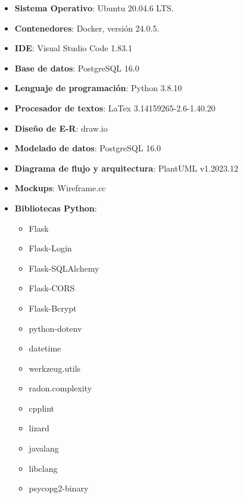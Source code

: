 \begin{appendices}
\begin{itemize}
    \item \textbf{Sistema Operativo}: Ubuntu 20.04.6 LTS.
    \item \textbf{Contenedores}: Docker, versión 24.0.5.
    \item \textbf{IDE}: Visual Studio Code 1.83.1
    \item \textbf{Base de datos}: PostgreSQL 16.0
    \item \textbf{Lenguaje de programación}: Python 3.8.10
    \item \textbf{Procesador de textos}: LaTex 3.14159265-2.6-1.40.20
    \item \textbf{Diseño de E-R}: draw.io
    \item \textbf{Modelado de datos}: PostgreSQL 16.0
    \item \textbf{Diagrama de flujo y arquitectura}: PlantUML v1.2023.12
    \item \textbf{Mockups}: Wireframe.cc
    \item \textbf{Bibliotecas Python}:
    \begin{multicols}{2}
        \begin{itemize}
            \item Flask \cite{flask}
            \item Flask-Login \cite{flask-login}
            \item Flask-SQLAlchemy \cite{flask-sqlalchemy}
            \item Flask-CORS \cite{flask-cors}
            \item Flask-Bcrypt \cite{flask-bcrypt}
            \item python-dotenv \cite{python-dotenv}
            \item datetime \cite{datetime}
            \item werkzeug.utils \cite{werkzeug}
            \item radon.complexity \cite{radon}
            \item cpplint \cite{cpplint}
            \item lizard \cite{lizard}
            \item javalang \cite{javalang}
            \item libclang \cite{libclang}
            \item psycopg2-binary \cite{psycopg2binary}
        \end{itemize}
    \end{multicols}
\end{itemize}


\end{appendices}
